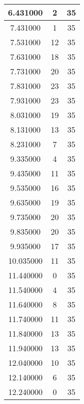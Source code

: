 \begin{longtable}[htbp]{|c|c|c|}
6.431000 & 2 & 35 \\ \hline
7.431000 & 1 & 35 \\ \hline
7.531000 & 12 & 35 \\ \hline
7.631000 & 18 & 35 \\ \hline
7.731000 & 20 & 35 \\ \hline
7.831000 & 23 & 35 \\ \hline
7.931000 & 23 & 35 \\ \hline
8.031000 & 19 & 35 \\ \hline
8.131000 & 13 & 35 \\ \hline
8.231000 & 7 & 35 \\ \hline
9.335000 & 4 & 35 \\ \hline
9.435000 & 11 & 35 \\ \hline
9.535000 & 16 & 35 \\ \hline
9.635000 & 19 & 35 \\ \hline
9.735000 & 20 & 35 \\ \hline
9.835000 & 20 & 35 \\ \hline
9.935000 & 17 & 35 \\ \hline
10.035000 & 11 & 35 \\ \hline
11.440000 & 0 & 35 \\ \hline
11.540000 & 4 & 35 \\ \hline
11.640000 & 8 & 35 \\ \hline
11.740000 & 11 & 35 \\ \hline
11.840000 & 13 & 35 \\ \hline
11.940000 & 13 & 35 \\ \hline
12.040000 & 10 & 35 \\ \hline
12.140000 & 6 & 35 \\ \hline
12.240000 & 0 & 35 \\ \hline
\end{longtable}
